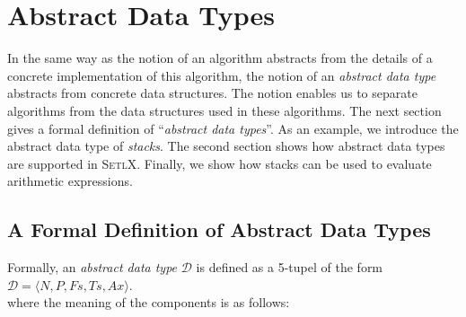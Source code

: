 \chapter{Abstract Data Types}
In the same way as the notion of an algorithm abstracts from the details of a concrete
implementation of this algorithm, the notion of an \emph{abstract data type} abstracts from concrete data
structures.  The notion enables us to separate algorithms from the data
structures used in these algorithms.  The next section gives a formal definition of
``\emph{abstract data types}''.  As an example, we introduce the abstract data type of \emph{stacks}.
The second section shows how abstract data types are supported in \textsc{SetlX}.  Finally, we show how stacks can be used
to evaluate arithmetic expressions.

\section[Formal Definition]{A Formal Definition of Abstract Data Types}
Formally, an \emph{abstract data type} $\mathcal{D}$ is defined as a 5-tupel of the form
\\[0.2cm]
\hspace*{1.3cm}
 $\mathcal{D} = \langle N, P, Fs, Ts, Ax \rangle$.
\\[0.2cm] 
where the meaning of the components is as follows:
